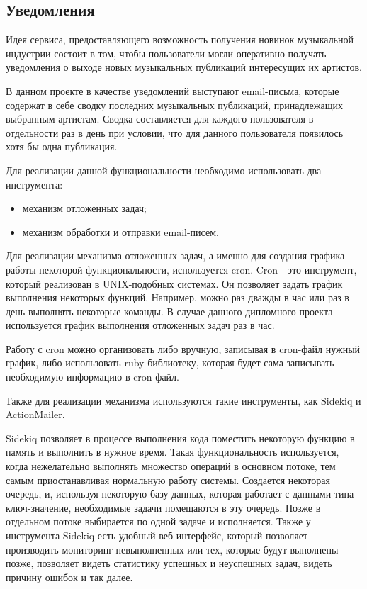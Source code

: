\subsection{Уведомления}

Идея сервиса, предоставляющего возможность получения новинок музыкальной индустрии состоит в том, чтобы пользователи могли оперативно получать уведомления о выходе новых музыкальных публикаций интересущих их артистов.

В данном проекте в качестве уведомлений выступают email-письма, которые содержат в себе сводку последних музыкальных публикаций, принадлежащих выбранным артистам. Сводка составляется для каждого пользователя в отдельности раз в день при условии, что для данного пользователя появилось хотя бы одна публикация.

Для реализации данной функциональности необходимо использовать два инструмента:

\begin{itemize}
  \item механизм отложенных задач;
  \item механизм обработки и отправки email-писем.
\end{itemize}

Для реализации механизма отложенных задач, а именно для создания графика работы некоторой функциональности, используется cron. Cron - это инструмент, который реализован в UNIX-подобных системах. Он позволяет задать график выполнения некоторых функций. Например, можно раз дважды в час или раз в день выполнять некоторые команды. В случае данного дипломного проекта используется график выполнения отложенных задач раз в час.

Работу с cron можно организовать либо вручную, записывая в cron-файл нужный график, либо использовать ruby-библиотеку, которая будет сама записывать необходимую информацию в cron-файл.

Также для реализации механизма используются такие инструменты, как Sidekiq и ActionMailer.

Sidekiq позволяет в процессе выполнения кода поместить некоторую функцию в память и выполнить в нужное время. Такая функциональность используется, когда нежелательно выполнять множество операций в основном потоке, тем самым приостанавливая нормальную работу системы. Создается некоторая очередь, и, используя некоторую базу данных, которая работает с данными типа ключ-значение, необходимые задачи помещаются в эту очередь. Позже в отдельном потоке выбирается по одной задаче и исполняется. Также у инструмента Sidekiq есть удобный веб-интерфейс, который позволяет производить мониторинг невыполненных или тех, которые будут выполнены позже, позволяет видеть статистику успешных и неуспешных задач, видеть причину ошибок и так далее.

